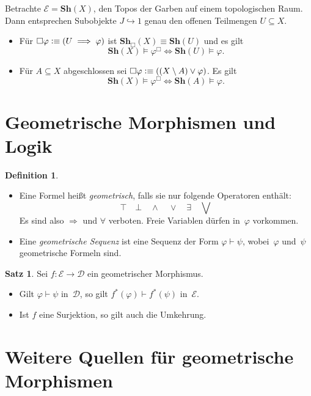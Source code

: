 \documentclass{article}
\theoremstyle{definition}
\newtheorem*{defn}{Definition}
\newtheorem*{satz}{Satz}
\theoremstyle{remark}
\newcommand{\defequiv}{\vcentcolon\equiv}
\newcommand{\?}{\,{:}\,}
\renewcommand{\_}{\mathpunct{.}\,}
\newcommand{\Sh}{\mathbf{Sh}} %
\newcommand{\Dat}{\mathcal{D}} %
\newcommand{\Eat}{\mathcal{E}} %
\begin{document}
Betrachte $\Eat = \Sh(X)$, den Topos der Garben auf einem topologischen Raum.
Dann entsprechen Subobjekte $J \hookrightarrow 1$ genau den offenen Teilmengen $U \subseteq X$.
\begin{itemize}
  \item
    Für $\Box \varphi \defequiv (U \implies \varphi)$ ist $\Sh_\Box(X) \equiv \Sh(U)$ und es gilt
    \[
      \Sh(X) \models \varphi^\Box \iff
      \Sh(U) \models \varphi.
    \]
  \item
    Für $A \subseteq X$ abgeschlossen sei $\Box \varphi \defequiv ((X \setminus A) \vee \varphi)$.
    Es gilt
    \[
      \Sh(X) \models \varphi^\Box \iff
      \Sh(A) \models \varphi.
    \]
\end{itemize}

\section{Geometrische Morphismen und Logik}

\begin{defn}
  \begin{itemize}
  \item
    Eine Formel heißt \emph{geometrisch}, falls sie nur folgende Operatoren enthält:
    \[
      \top \quad
      \bot \quad
      \wedge \quad
      \vee \quad
      \exists \quad
      \bigvee
    \]
    Es sind also $\Rightarrow$ und $\forall$ verboten. Freie Variablen dürfen in~$\varphi$ vorkommen.
  \item
    Eine \emph{geometrische Sequenz} ist eine Sequenz der Form $\varphi \vdash \psi$, wobei~$\varphi$ und~$\psi$ geometrische Formeln sind.
  \end{itemize}
\end{defn}

\begin{satz}
  Sei $f : \Eat \to \Dat$ ein geometrischer Morphismus.
  \begin{itemize}
  \item Gilt $\varphi \vdash \psi$ in~$\Dat$, so gilt $f^*(\varphi) \vdash f^*(\psi)$ in~$\Eat$.
  \item Ist $f$ eine Surjektion, so gilt auch die Umkehrung.
  \end{itemize}
\end{satz}

\section{Weitere Quellen für geometrische Morphismen}
\end{document}
